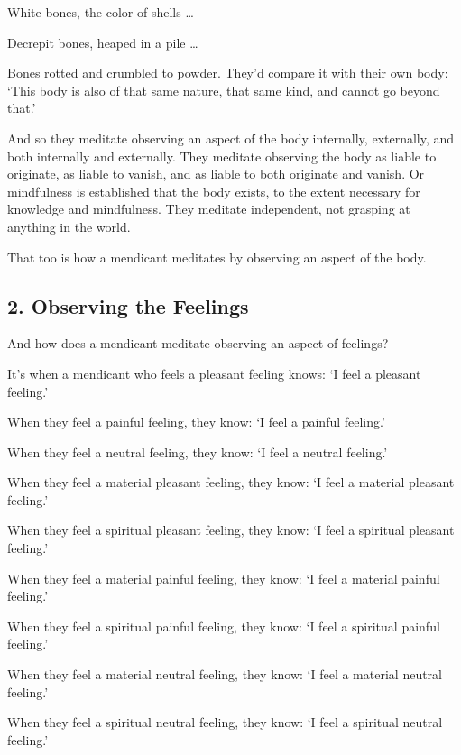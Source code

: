 \documentclass[12pt,openany]{book}%
\begin{document}
White bones, the color of shells … 

Decrepit bones, heaped in a pile … 

Bones rotted and crumbled to powder. They’d compare it with their own body: ‘This body is also of that same nature, that same kind, and cannot go beyond that.’ 

And so they meditate observing an aspect of the body internally, externally, and both internally and externally. They meditate observing the body as liable to originate, as liable to vanish, and as liable to both originate and vanish. Or mindfulness is established that the body exists, to the extent necessary for knowledge and mindfulness. They meditate independent, not grasping at anything in the world. 

That too is how a mendicant meditates by observing an aspect of the body. 

\subsection*{2. Observing the Feelings }

And how does a mendicant meditate observing an aspect of feelings? 

It’s when a mendicant who feels a pleasant feeling knows: ‘I feel a pleasant feeling.’ 

When they feel a painful feeling, they know: ‘I feel a painful feeling.’ 

When they feel a neutral feeling, they know: ‘I feel a neutral feeling.’ 

When they feel a material pleasant feeling, they know: ‘I feel a material pleasant feeling.’ 

When they feel a spiritual pleasant feeling, they know: ‘I feel a spiritual pleasant feeling.’ 

When they feel a material painful feeling, they know: ‘I feel a material painful feeling.’ 

When they feel a spiritual painful feeling, they know: ‘I feel a spiritual painful feeling.’ 

When they feel a material neutral feeling, they know: ‘I feel a material neutral feeling.’ 

When they feel a spiritual neutral feeling, they know: ‘I feel a spiritual neutral feeling.’ 
\end{document}
